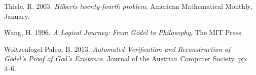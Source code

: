 \documentclass[smallextended]{svjour3}
\begin{document}
\begin{thebibliography}{9}
 Thiele, R. 2003. {\itshape Hilberts twenty-fourth problem}, American Mathematical Monthly, January. 

Wang, H. 1996. {\itshape A Logical Journey: From G\"odel to Philosophy}, The MIT Press. 

 Woltzenlogel Paleo, B. 2013. {\itshape Automated Verification and Reconstruction of G\"odel's Proof of God's Existence}. Journal of the Austrian Computer Society. pp. 4--6.

















\end{thebibliography}
\end{document}
